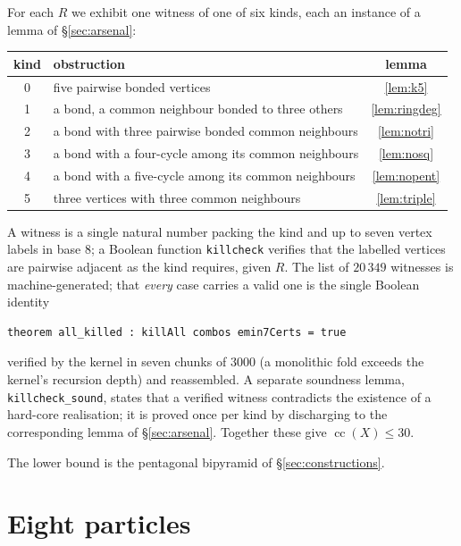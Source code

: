 \documentclass[11pt,a4paper]{article}
\theoremstyle{plain}
\theoremstyle{definition}
\begin{document}
For each $R$ we exhibit one witness of one of six kinds, each an instance of a lemma of
\S\ref{sec:arsenal}:

\begin{center}
\begin{tabular}{clc}
\toprule
kind & obstruction & lemma \\
\midrule
0 & five pairwise bonded vertices & \ref{lem:k5} \\
1 & a bond, a common neighbour bonded to three others & \ref{lem:ringdeg} \\
2 & a bond with three pairwise bonded common neighbours & \ref{lem:notri} \\
3 & a bond with a four-cycle among its common neighbours & \ref{lem:nosq} \\
4 & a bond with a five-cycle among its common neighbours & \ref{lem:nopent} \\
5 & three vertices with three common neighbours & \ref{lem:triple} \\
\bottomrule
\end{tabular}
\end{center}

A witness is a single natural number packing the kind and up to seven vertex labels in
base $8$; a Boolean function \texttt{killcheck} verifies that the labelled vertices are
pairwise adjacent as the kind requires, given $R$. The list of $20\,349$ witnesses is
machine-generated; that \emph{every} case carries a valid one is the single Boolean
identity

\begin{Verbatim}
theorem all_killed : killAll combos emin7Certs = true
\end{Verbatim}

\noindent verified by the kernel in seven chunks of $3000$ (a monolithic fold exceeds
the kernel's recursion depth) and reassembled. A separate soundness lemma,
\texttt{killcheck\_sound}, states that a verified witness contradicts the existence of
a hard-core realisation; it is proved once per kind by discharging to the corresponding
lemma of \S\ref{sec:arsenal}. Together these give $\operatorname{cc}(X) \le 30$.

The lower bound is the pentagonal bipyramid of \S\ref{sec:constructions}.

\section{Eight particles}
\label{sec:eight}
\end{document}
